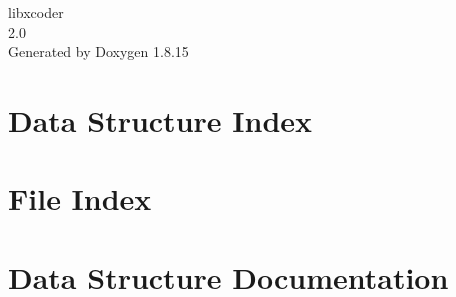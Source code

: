 \let\mypdfximage\pdfximage\def\pdfximage{\immediate\mypdfximage}\documentclass[twoside]{book}
\newcommand{\+}{\discretionary{\mbox{\scriptsize$\hookleftarrow$}}{}{}}
\newcommand{\clearemptydoublepage}{%
  \newpage{\pagestyle{empty}\cleardoublepage}%
}
\begin{document}
\hypersetup{pageanchor=false,
             bookmarksnumbered=true,
             pdfencoding=unicode
            }
\begin{titlepage}
\vspace*{7cm}
\begin{center}%
{\Large libxcoder \\[1ex]\large 2.\+0 }\\
\vspace*{1cm}
{\large Generated by Doxygen 1.8.15}\\
\end{center}
\end{titlepage}
\clearemptydoublepage
{}
\tableofcontents
\clearemptydoublepage
{}
\hypersetup{pageanchor=true}

\chapter{Data Structure Index}

\chapter{File Index}

\chapter{Data Structure Documentation}














































\end{document}
